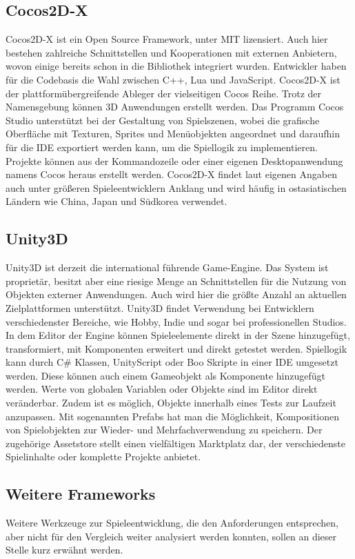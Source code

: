 \subsection{Cocos2D-X}
Cocos2D-X ist ein Open Source Framework, unter MIT lizensiert. Auch hier bestehen zahlreiche Schnittstellen und Kooperationen mit externen Anbietern, wovon einige bereits schon in die Bibliothek integriert wurden. Entwickler haben für die Codebasis die Wahl zwischen C++, Lua und JavaScript. Cocos2D-X ist der plattformübergreifende Ableger der vielseitigen Cocos Reihe. Trotz der Namensgebung können 3D Anwendungen erstellt werden. Das Programm Cocos Studio unterstützt bei der Gestaltung von Spielszenen, wobei die grafische Oberfläche mit Texturen, Sprites und Menüobjekten angeordnet und daraufhin für die IDE exportiert werden kann, um die Spiellogik zu implementieren. Projekte können aus der Kommandozeile oder einer eigenen Desktopanwendung namens Cocos heraus erstellt werden. Cocos2D-X findet laut eigenen Angaben auch unter größeren Spieleentwicklern Anklang und wird häufig in ostasiatischen Ländern wie China, Japan und Südkorea verwendet. \citep{cocos2d_main_features}


\subsection{Unity3D}
Unity3D ist derzeit die international führende Game-Engine. Das System ist proprietär, besitzt aber eine riesige Menge an Schnittstellen für die Nutzung von Objekten externer Anwendungen. Auch wird hier die größte Anzahl an aktuellen Zielplattformen unterstützt. Unity3D findet Verwendung bei Entwicklern verschiedenster Bereiche, wie Hobby, Indie und sogar bei professionellen Studios. In dem Editor der Engine können Spieleelemente direkt in der Szene hinzugefügt, transformiert, mit Komponenten erweitert und direkt getestet werden. Spiellogik kann durch C\# Klassen, UnityScript oder Boo Skripte in einer IDE umgesetzt werden. Diese können auch einem Gameobjekt als Komponente hinzugefügt werden. Werte von globalen Variablen oder Objekte sind im Editor direkt veränderbar. Zudem ist es möglich, Objekte innerhalb eines Tests zur Laufzeit anzupassen. Mit sogenannten Prefabs hat man die Möglichkeit, Kompositionen von Spielobjekten zur Wieder- und Mehrfachverwendung zu speichern. Der zugehörige Assetstore stellt einen vielfältigen Marktplatz dar, der verschiedenste Spielinhalte oder komplette Projekte anbietet. \citep{unity_public_relations}


\subsection{Weitere Frameworks}
Weitere Werkzeuge zur Spieleentwicklung, die den Anforderungen entsprechen, aber nicht für den Vergleich weiter analysiert werden konnten, sollen an dieser Stelle kurz erwähnt werden.

